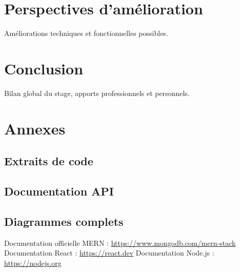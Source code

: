 \documentclass[12pt,a4paper]{report}
\begin{document}
\chapter{Perspectives d’amélioration}
Améliorations techniques et fonctionnelles possibles.  

\chapter{Conclusion}
Bilan global du stage, apports professionnels et personnels.  

\appendix
\chapter{Annexes}
\section{Extraits de code}
\section{Documentation API}
\section{Diagrammes complets}

\begin{thebibliography}{9}
 Documentation officielle MERN : \url{https://www.mongodb.com/mern-stack}
 Documentation React : \url{https://react.dev}
 Documentation Node.js : \url{https://nodejs.org}
\end{thebibliography}
\end{document}
